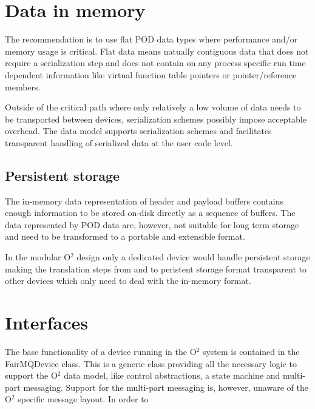 \documentclass[a4paper,twoside]{article}
\def\O2{O$^2$}
\begin{document}
\section{Data in memory}
The recommendation is to use flat POD data types where performance and/or memory usage is critical. Flat data means natually contiguous data that does not require a serialization step and does not contain on any process specific run time dependent information like virtual function table pointers or pointer/reference members.

Outside of the critical path where only relatively a low volume of data needs to be transported between devices, serialization schemes possibly impose acceptable overhead. The data model supports serialization schemes and facilitates transparent handling of serialized data at the user code level.

\subsection{Persistent storage}
The in-memory data representation of header and payload buffers contains enough information to be stored on-disk directly as a sequence of buffers. The data represented by POD data are, however, not suitable for long term storage and need to be transformed to a portable and extensible format.

In the modular \O2 design only a dedicated device would handle persistent storage making the translation steps from and to peristent storage format transparent to other devices which only need to deal with the in-memory format.

\section{Interfaces}
The base functionality of a device running in the \O2 system is contained in the FairMQDevice class. This is a generic class providing all the necessary logic to support the \O2 data model, like control abstractions, a state machine and multi-part messaging. Support for the multi-part messaging is, however, unaware of the \O2 specific message layout. In order to 

\printbibliography
\end{document}
